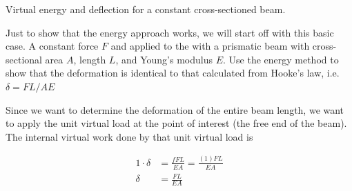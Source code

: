 \documentclass[
10pt,
a4paper,
openany,
svgnames,
]{book} %
\begin{document}
\begin{example} Virtual energy and deflection for a constant cross-sectioned beam.

  Just to show that the energy approach works, we will start off with this basic case. A constant force $F$ and applied to the with a prismatic beam with cross-sectional area $A$, length $L$, and Young's modulus $E$. Use the energy method to show that the deformation is identical to that calculated from Hooke's law, i.e. $\delta = FL/AE$

  \centering
\end{example}
\begin{solution}
  Since we want to determine the deformation of the entire beam length, we want to apply the unit virtual load at the point of interest (the free end of the beam). The internal virtual work done by that unit virtual load is

  \begin{align*}
    1 \cdot \delta &= \frac{fFL}{EA} = \frac{(1)FL}{EA} \\
    \delta &= \frac{FL}{EA} 
  \end{align*}
\end{solution}
\end{document}
